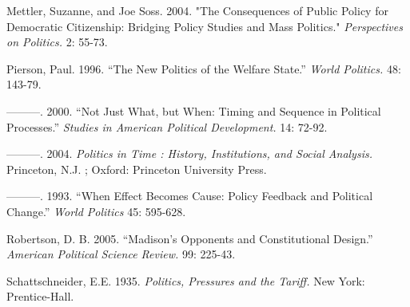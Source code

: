 Mettler, Suzanne, and Joe Soss. 2004. "The Consequences of Public Policy for Democratic Citizenship: Bridging Policy Studies and Mass Politics."  \textit{Perspectives on Politics.} 2: 55-73.






Pierson, Paul.  1996.  ``The New Politics of the Welfare State.'' \textit{ World Politics.} 48: 143-79.

———.  2000. ``Not Just What, but When:  Timing and Sequence in Political Processes.''  \textit{Studies in American Political Development.} 14: 72-92.

———.  2004.  \textit{Politics in Time : History, Institutions, and Social Analysis.}  Princeton, N.J. ; Oxford: Princeton University Press.

———.  1993.  ``When Effect Becomes Cause: Policy Feedback and Political Change.''  \textit{World Politics} 45: 595-628.


Robertson, D. B.  2005.  ``Madison's Opponents and Constitutional Design.''  \textit{American Political Science Review.} 99: 225-43.


Schattschneider, E.E.  1935.  \textit{Politics, Pressures and the Tariff. } New York: Prentice-Hall.


